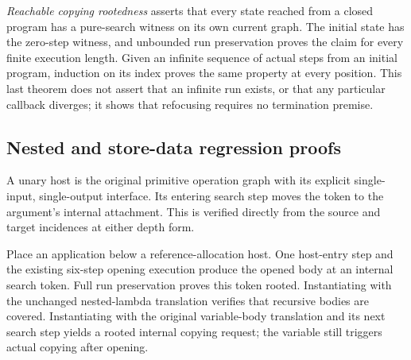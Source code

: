 
\emph{Reachable copying rootedness} asserts that every state reached from a
closed program has a pure-search witness on its own current graph. The initial
state has the zero-step witness, and unbounded run preservation proves the
claim for every finite execution length. Given an infinite sequence of actual
steps from an initial program, induction on its index proves the same property
at every position. This last theorem does not assert that an infinite run
exists, or that any particular callback diverges; it shows that refocusing
requires no termination premise.



\subsection{Nested and store-data regression proofs}

A unary host is the original primitive operation graph with its explicit
single-input, single-output interface. Its entering search step moves the
token to the argument's internal attachment. This is verified directly from
the source and target incidences at either depth form.



Place an application below a reference-allocation host. One host-entry step
and the existing six-step opening execution produce the opened body at an
internal search token. Full run preservation proves this token rooted.
Instantiating with the unchanged nested-lambda translation verifies that
recursive bodies are covered. Instantiating with the original variable-body
translation and its next search step yields a rooted internal copying request;
the variable still triggers actual copying after opening.



